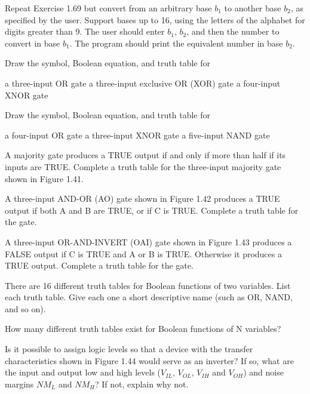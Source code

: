 \exercise %
Repeat Exercise 1.69 but convert from an arbitrary base $b_1$ to another base $b_2$, as specified by
the user. Support bases up to 16, using the letters of the alphabet for digits greater than 9. The user
should enter $b_1$, $b_2$, and then the number to convert in base $b_1$. The program should print the
equivalent number in base $b_2$.

\exercise %
Draw the symbol, Boolean equation, and truth table for
\begin{tasks}
	\task a three-input OR gate
	\task a three-input exclusive OR (XOR) gate
	\task a four-input XNOR gate
\end{tasks}

\exercise %
Draw the symbol, Boolean equation, and truth table for
\begin{tasks}
	\task a four-input OR gate
	\task a three-input XNOR gate
	\task a five-input NAND gate
\end{tasks}

\exercise %
A majority gate produces a TRUE output if and only if more than half if its inputs are TRUE.
Complete a truth table for the three-input majority gate shown in Figure 1.41.

\exercise %
A three-input AND-OR (AO) gate shown in Figure 1.42 produces a TRUE output if both A and B are
TRUE, or if C is TRUE. Complete a truth table for the gate.

\exercise %
A three-input OR-AND-INVERT (OAI) gate shown in Figure 1.43 produces a FALSE output if C is
TRUE and A or B is TRUE. Otherwise it produces a TRUE output. Complete a truth table for the
gate.

\exercise %
There are 16 different truth tables for Boolean functions of two variables. List each truth
table. Give each one a short descriptive name (such as OR, NAND, and so on).

\exercise %
How many different truth tables exist for Boolean functions of N variables?

\exercise %
Is it possible to assign logic levels so that a device with the transfer characteristics shown
in Figure 1.44 would serve as an inverter? If so, what are the input and output low and high
levels ($V_{IL}$, $V_{OL}$, $V_{IH}$ and $V_{OH}$) and noise margins $NM_{L}$ and $NM_{H}$?
If not, explain why not.

